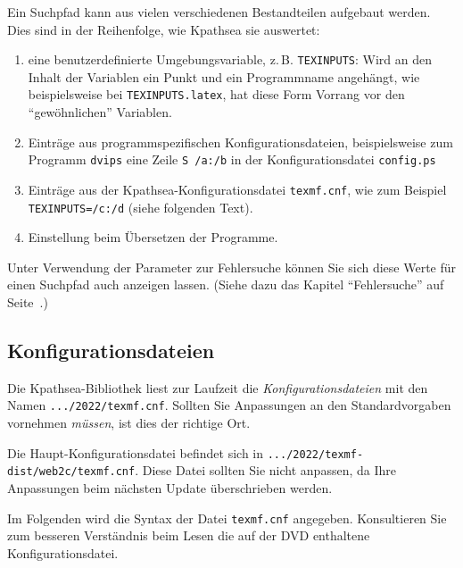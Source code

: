\documentclass[12pt,ngerman,a4paper,fullparskip]{report}
\newcommand{\code}[1]{\texttt{#1}}
\newcommand{\file}[1]{\texttt{#1}}
\newcommand{\envname}[1]{\texttt{#1}}
\newcommand{\KPS}{Kpathsea\xspace}
\begin{document}
Ein Suchpfad kann aus vielen verschiedenen Bestandteilen aufgebaut werden.
Dies sind in der Reihenfolge, wie {\KPS} sie auswertet:

\begin{enumerate}
\item
  eine benutzerdefinierte Umgebungsvariable, z.\,B. \envname{TEXINPUTS}:
  Wird an den Inhalt der Variablen ein Punkt und ein Programmname angehängt, wie
  beispielsweise bei \envname{TEXINPUTS.latex}, hat diese Form Vorrang
  vor den \enquote{gewöhnlichen} Variablen.
\item
  Einträge aus programmspezifischen Konfigurationsdateien,
  beispielsweise zum Programm \code{dvips} eine Zeile \code{S /a:/b}
  in der Konfigurationsdatei \file{config.ps}
\item
  Einträge aus der \KPS-Konfigurationsdatei \file{texmf.cnf}, wie 
  zum Beispiel \code{TEXINPUTS=/c:/d} (siehe folgenden Text).
\item
  Einstellung beim Übersetzen der Programme.
\end{enumerate}

\noindent Unter Verwendung der Parameter zur Fehlersuche können Sie sich diese
Werte für einen Suchpfad auch anzeigen lassen. (Siehe dazu das Kapitel
\enquote{Fehlersuche} auf Seite~\pageref{sec:debugging}.)

\subsection{Konfigurationsdateien}

Die \KPS-Bibliothek liest zur Laufzeit die \emph{Konfigurationsdateien} mit den Namen \file{.../2022/texmf.cnf}. Sollten Sie Anpassungen an den Standardvorgaben vornehmen \textit{müssen}, ist dies der richtige Ort. 

Die Haupt-Konfigurationsdatei befindet sich in \file{.../2022/texmf-dist/web2c/texmf.cnf}. Diese Datei sollten Sie nicht anpassen, da Ihre Anpassungen beim nächsten Update überschrieben werden.

Im Folgenden wird die Syntax der Datei \file{texmf.cnf} angegeben. Konsultieren Sie zum besseren Verständnis beim Lesen die auf der DVD enthaltene Konfigurationsdatei.
\end{document}
